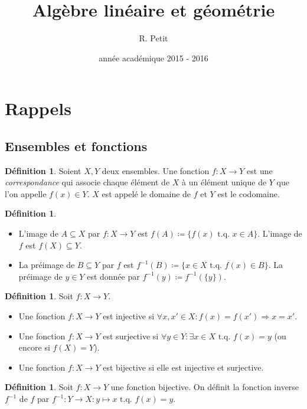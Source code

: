 \documentclass{article}
\title{Algèbre linéaire et géométrie}
\author{R. Petit}
\date{année académique 2015 - 2016}
\newcommand{\tq}{\textrm{ t.q. }}
\theoremstyle{definition}
\newtheorem{déf}[thm]{Définition}
\theoremstyle{remark}
\begin{document}
\maketitle
\tableofcontents
\newpage
{}

\section{Rappels}
	\subsection{Ensembles et fonctions}
		\begin{déf} Soient $X, Y$ deux ensembles. Une fonction $f : X \to Y$ est une \textit{correspondance} qui associe chaque élément de $X$ à un élément unique de $Y$
		que l'on appelle $f(x) \in Y$. $X$ est appelé le domaine de $f$ et $Y$ est le codomaine. \end{déf}

		\begin{déf}~
		\begin{itemize}
			\item L'image de $A \subseteq X$ par $f : X \to Y$ est $f(A) \coloneqq \{f(x) \tq x \in A\}$. L'image de $f$ est $f(X) \subseteq Y$.
			\item La préimage de $B \subseteq Y$ par $f$ est $f^{-1}(B) \coloneqq \{x \in X \tq f(x) \in B\}$. La préimage de $y \in Y$ est donnée par
			      $f^{-1}(y) \coloneqq f^{-1}(\{y\})$.
		\end{itemize}
		\end{déf}

		\begin{déf} Soit $f : X \to Y$.
		\begin{itemize}
			\item Une fonction $f : X \to Y$ est injective si $\forall x, x' \in X : f(x) = f(x') \Rightarrow x = x'$.
			\item Une fonction $f : X \to Y$ est surjective si $\forall y \in Y : \exists x \in X \tq f(x) = y$ (ou encore si $f(X) = Y$).
			\item Une fonction $f : X \to Y$ est bijective si elle est injective et surjective.
		\end{itemize}
		\end{déf}

		\begin{déf} Soit $f : X \to Y$ une fonction bijective. On définit la fonction inverse $f^{-1}$ de $f$ par $f^{-1} : Y \to X : y \mapsto x \tq f(x) = y$. \end{déf}
\end{document}
